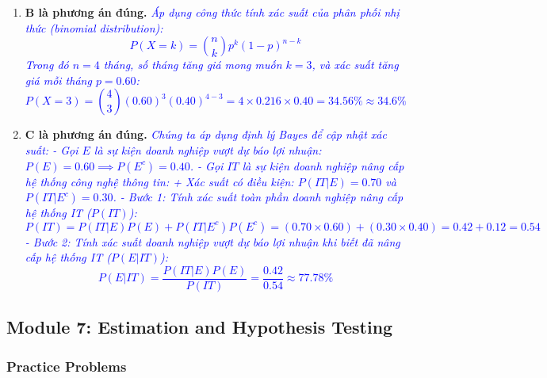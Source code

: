 \begin{enumerate}
	\item \textbf{B là phương án đúng.} \textcolor{blue}{\textit{Áp dụng công thức tính xác suất của phân phối nhị thức (binomial distribution):
	      \[
	      P(X = k) = \binom{n}{k} p^k (1-p)^{n-k}
	      \]
	      Trong đó $n = 4$ tháng, số tháng tăng giá mong muốn $k = 3$, và xác suất tăng giá mỗi tháng $p = 0.60$:
	      \[
	      P(X = 3) = \binom{4}{3} (0.60)^3 (0.40)^{4-3} = 4 \times 0.216 \times 0.40 = 34.56\% \approx 34.6\%
	      \]}}

	\item \textbf{C là phương án đúng.} \textcolor{blue}{\textit{Chúng ta áp dụng định lý Bayes để cập nhật xác suất:
	      - Gọi $E$ là sự kiện doanh nghiệp vượt dự báo lợi nhuận: $P(E) = 0.60 \implies P(E^c) = 0.40$.
	      - Gọi $IT$ là sự kiện doanh nghiệp nâng cấp hệ thống công nghệ thông tin:
	        + Xác suất có điều kiện: $P(IT|E) = 0.70$ và $P(IT|E^c) = 0.30$.
	      - Bước 1: Tính xác suất toàn phần doanh nghiệp nâng cấp hệ thống IT ($P(IT)$):
	        \[
	        P(IT) = P(IT|E)P(E) + P(IT|E^c)P(E^c) = (0.70 \times 0.60) + (0.30 \times 0.40) = 0.42 + 0.12 = 0.54
	        \]
	      - Bước 2: Tính xác suất doanh nghiệp vượt dự báo lợi nhuận khi biết đã nâng cấp hệ thống IT ($P(E|IT)$):
	        \[
	        P(E|IT) = \frac{P(IT|E)P(E)}{P(IT)} = \frac{0.42}{0.54} \approx 77.78\%
	        \]}}
\end{enumerate}

\newpage

\subsection{Module 7: Estimation and Hypothesis Testing}
\label{sec:app_Problems_M7}

\subsubsection{Practice Problems}
\label{subsec:app_Problems_M7}


